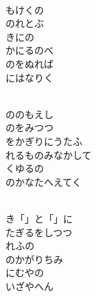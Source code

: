 \documentclass[10pt,b5j]{tarticle} %
\begin{document}
\begin{enumerate}
\begin{minipage}[c]{\blocksize}
        \vspace{\linespace}
        \item~\\
        もけくの\\
        のれとぶ\\
        きにの\\
        かにるのべ\\
        のをぬれば\\
        にはなりく
        
    \end{minipage}
    \begin{minipage}[c]{\blocksize}
        
        \vspace{\linespace}
        \item~\\
        ののもえし\\
        のをみつつ\\
        をかぎりにうたふ\\
        れるものみなかして\\
        くゆるの\\
        のかなたへえてく
        
    \end{minipage}
    \begin{minipage}[c]{\blocksize}
        
        \vspace{\linespace}
        \item~\\
        き「」と「」に\\
        たぎるをしつつ\\
        れふの\\
        のかがりちみ\\
        にむやの\\
        いざやへん
    
    \end{minipage}
\end{enumerate} %
\end{document}
